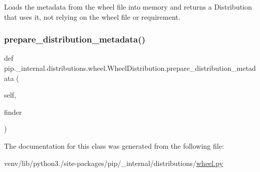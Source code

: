 \begin{DoxyVerb}Loads the metadata from the wheel file into memory and returns a
Distribution that uses it, not relying on the wheel file or
requirement.
\end{DoxyVerb}
 \mbox{\label{classpip_1_1__internal_1_1distributions_1_1wheel_1_1WheelDistribution_a08370c64031629dcd8591ae907bdd5d9}} 
\subsubsection{\texorpdfstring{prepare\+\_\+distribution\+\_\+metadata()}{prepare\_distribution\_metadata()}}
{\footnotesize\ttfamily def pip.\+\_\+internal.\+distributions.\+wheel.\+Wheel\+Distribution.\+prepare\+\_\+distribution\+\_\+metadata (\begin{DoxyParamCaption}\item[{}]{self,  }\item[{}]{finder }\end{DoxyParamCaption})}



The documentation for this class was generated from the following file\+:\begin{DoxyCompactItemize}
\item 
venv/lib/python3./site-\/packages/pip/\+\_\+internal/distributions/\hyperlink{pip_2__internal_2distributions_2wheel_8py}{wheel.\+py}\end{DoxyCompactItemize}
